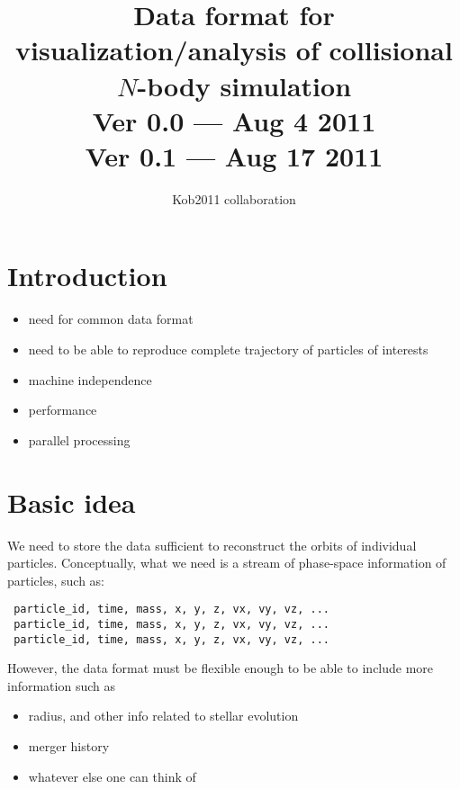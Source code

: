\documentclass[12pt]{article}
\begin{document}
\def\bx{{\bf x}}
\def\bv{{\bf v}}
\def\ba{{\bf a}}
\def\badot{{\bf \dot{a}}}
\def\batwodot{{\bf a}^{(2)}}
\def\bathreedot{{\bf a}^{(3)}}
\def\bj{{\bf j}}
\def\dt{{\Delta t}}
\def\comment#1{}
\def\sub#1{_{\rm #1}}
\def\sup#1{^{\rm #1}}
\def\APJ{{\it Ap. J. }}
\def\APJL{{\it Ap. J. Lett. }}


\title{Data format for visualization/analysis of collisional $N$-body simulation\\
{\large 
Ver 0.0 --- Aug 4 2011\\
Ver 0.1 --- Aug 17 2011\\
}
}
\author{Kob2011 collaboration}
\maketitle

\tableofcontents

\newpage

\thispagestyle{empty}




\section{Introduction}

\begin{itemize}

 \item need for common data format
 \item need to be able to reproduce complete trajectory of particles
   of interests
 \item machine independence
 \item performance
 \item parallel processing
\end{itemize}

\section{Basic idea}


We need to store the data sufficient to reconstruct the orbits of
individual particles. Conceptually, what we need is a stream of
phase-space information of particles, such as:
\begin{verbatim}
 particle_id, time, mass, x, y, z, vx, vy, vz, ...
 particle_id, time, mass, x, y, z, vx, vy, vz, ...
 particle_id, time, mass, x, y, z, vx, vy, vz, ...
\end{verbatim}
However, the data format must be flexible enough to be able to include
more information such as
\begin{itemize}
 \item radius, and other info related to stellar evolution
 \item merger history
 \item whatever else one can think of
\end{itemize}
\end{document}
